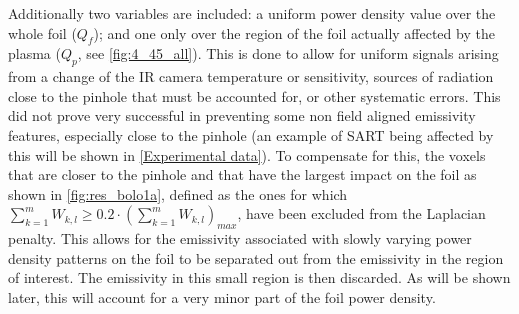 Additionally two variables are included: a uniform power density value over the whole foil ($Q_f$); and one only over the region of the foil actually affected by the plasma ($Q_p$, see \autoref{fig:4_45_all}). This is done to allow for uniform signals arising from a change of the IR camera temperature or sensitivity, sources of radiation close to the pinhole that must be accounted for, or other systematic errors. This did not prove very successful in preventing some non field aligned emissivity features, especially close to the pinhole (an example of SART being affected by this will be shown in \autoref{Experimental data}). To compensate for this, the voxels that are closer to the pinhole and that have the largest impact on the foil as shown in \autoref{fig:res_bolo1a}, defined as the ones for which $\sum_{k=1}^{m} W_{k,l} \geq 0.2 \cdot (\sum_{k=1}^{m} W_{k,l})_{max}$, have been excluded from the Laplacian penalty. This allows for the emissivity associated with slowly varying power density patterns on the foil to be separated out from the emissivity in the region of interest. The emissivity in this small region is then discarded. As will be shown later, this will account for a very minor part of the foil power density.


